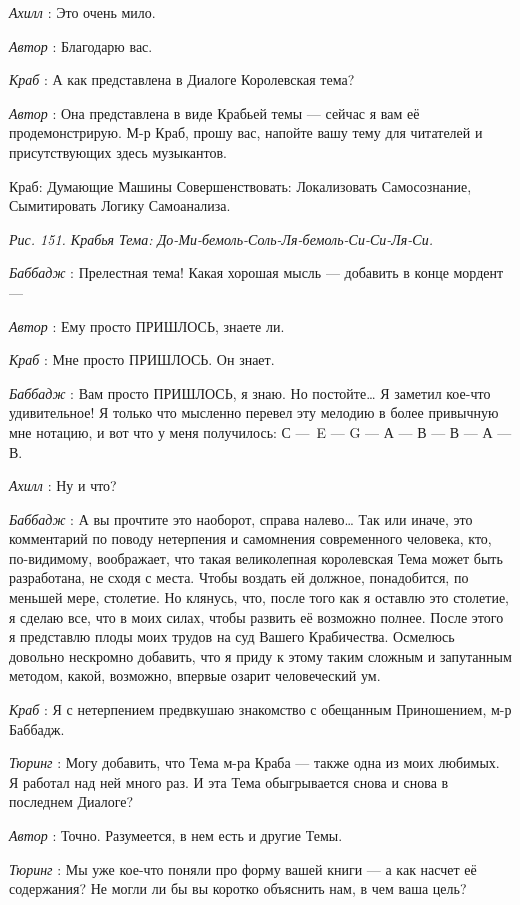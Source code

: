 \documentclass[../main.tex]{subfiles}
\begin{document}
\begin{dialogue}
\emph{Ахилл} : Это очень мило.

\emph{Автор} : Благодарю вас.

\emph{Краб} : А как представлена в Диалоге Королевская тема?

\emph{Автор} : Она представлена в виде Крабьей темы --- сейчас я вам её продемонстрирую. М-р Краб, прошу вас, напойте вашу тему для читателей и присутствующих здесь музыкантов.

Краб: Думающие Машины Совершенствовать: Локализовать Самосознание, Сымитировать Логику Самоанализа.

\emph{Рис. 151. Крабья Тема: До-Ми-бемоль-Соль-Ля-бемоль-Си-Си-Ля-Си.}

\emph{Баббадж} : Прелестная тема! Какая хорошая мысль --- добавить в конце мордент ---

\emph{Автор} : Ему просто ПРИШЛОСЬ, знаете ли.

\emph{Краб} : Мне просто ПРИШЛОСЬ. Он знает.

\emph{Баббадж} : Вам просто ПРИШЛОСЬ, я знаю. Но постойте\ldots{} Я заметил кое-что удивительное! Я только что мысленно перевел эту мелодию в более привычную мне нотацию, и вот что у меня получилось: С ---~E --- G --- А --- В --- В --- А --- В.

\emph{Ахилл} : Ну и что?

\emph{Баббадж} : А вы прочтите это наоборот, справа налево\ldots{} Так или иначе, это комментарий по поводу нетерпения и самомнения современного человека, кто, по-видимому, воображает, что такая великолепная королевская Тема может быть разработана, не сходя с места. Чтобы воздать ей должное, понадобится, по меньшей мере, столетие. Но клянусь, что, после того как я оставлю это столетие, я сделаю все, что в моих силах, чтобы развить её возможно полнее. После этого я представлю плоды моих трудов на суд Вашего Крабичества. Осмелюсь довольно нескромно добавить, что я приду к этому таким сложным и запутанным методом, какой, возможно, впервые озарит человеческий ум.

\emph{Краб} : Я с нетерпением предвкушаю знакомство с обещанным Приношением, м-р Баббадж.

\emph{Тюринг} : Могу добавить, что Тема м-ра Краба --- также одна из моих любимых. Я работал над ней много раз. И эта Тема обыгрывается снова и снова в последнем Диалоге?

\emph{Автор} : Точно. Разумеется, в нем есть и другие Темы.

\emph{Тюринг} : Мы уже кое-что поняли про форму вашей книги --- а как насчет её содержания? Не могли ли бы вы коротко объяснить нам, в чем ваша цель?


\end{dialogue}
\end{document}
